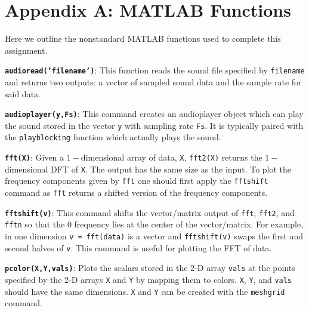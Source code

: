 \documentclass[fleqn,10pt]{../SelfArx} %
\begin{document}




\section*{Appendix A: MATLAB Functions} %
Here we outline the nonstandard MATLAB functions used to complete this assignment.
\vskip 0.5cm

\noindent \texttt{\textbf{audioread('filename')}}: This function reads the sound file specified by \texttt{filename} and returns two outputs: a vector of sampled sound data and the sample rate for said data.
\vskip 0.3cm

\noindent \texttt{\textbf{audioplayer(y,Fs)}}: This command creates an audioplayer object which can play the sound stored in the vector \texttt{y} with sampling rate \texttt{Fs}. It is typically paired with the \texttt{playblocking} function which actually plays the sound.
\vskip 0.3cm

\noindent \texttt{\textbf{fft(X)}}: Given a $1-$dimensional array of data, \texttt{X}, \texttt{fft2(X)} returns the $1-$dimensional DFT of \texttt{X}. The output has the same size as the input. To plot the frequency components given by \texttt{fft} one should first apply the \texttt{fftshift} command as \texttt{fft} returns a shifted version of the frequency components.
\vskip 0.3cm

\noindent \texttt{\textbf{fftshift(v)}}: This command shifts the vector/matrix output of \texttt{fft}, \texttt{fft2}, and \texttt{fftn} so that the 0 frequency lies at the center of the vector/matrix. For example, in one dimension \texttt{v = fft(data)} is a vector and \texttt{fftshift(v)} swaps the first and second halves of \texttt{v}. This command is useful for plotting the FFT of data.
\vskip 0.3cm

\noindent \texttt{\textbf{pcolor(X,Y,vals)}}: Plots the scalars stored in the 2-D array \texttt{vals} at the points specified by the 2-D arrays \texttt{X} and \texttt{Y} by mapping them to colors. \texttt{X}, \texttt{Y}, and \texttt{vals} should have the same dimensions. \texttt{X} and \texttt{Y} can be created with the \texttt{meshgrid} command.
\vskip 0.3cm
\end{document}
